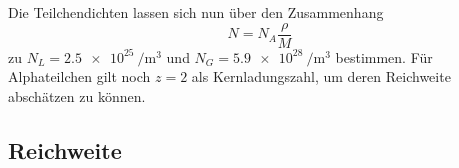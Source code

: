 
Die Teilchendichten lassen sich nun über den Zusammenhang
\begin{equation*}
	N = N_{\! A} \frac{\rho}{M}
\end{equation*}
zu $N_L = \qty{2.5e25}{\per\meter\cubed}$ und $N_G = \qty{5.9e28}{\per\meter\cubed}$ bestimmen. Für Alphateilchen gilt noch $z = 2$ als
Kernladungszahl, um deren Reichweite abschätzen zu können.

% 
% 
% 
% 

% 
% 
% 

\subsection*{Reichweite}

